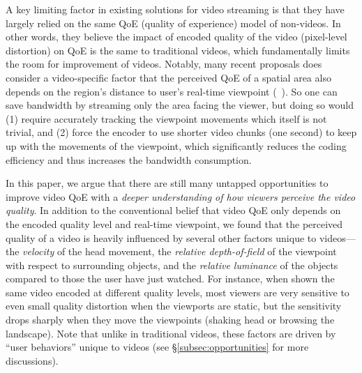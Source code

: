 A key limiting factor in existing solutions for \vr video streaming is that they have largely relied on the same QoE (quality of experience) model of non-\vr videos. 
In other words, they believe the impact of encoded quality of the video (\eg pixel-level distortion) on QoE is the same to traditional videos, which fundamentally limits the room for improvement of \vr videos.
Notably, many recent proposals does consider a {\vr}video-specific factor that the perceived QoE of a spatial area also depends on the region's distance to user's real-time viewpoint (\eg~\cite{??,??,??,??}).
So one can save bandwidth by streaming only the area facing the viewer, but doing so would (1) require accurately tracking the viewpoint movements which itself is not trivial, and (2) force the encoder to use shorter video chunks (\eg one second) to keep up with the movements of the viewpoint, which significantly reduces the coding efficiency and thus increases the bandwidth consumption.

In this paper, we argue that there are still many untapped opportunities to improve \vr video QoE with a {\em deeper understanding of how viewers perceive the \vr video quality}.
In addition to the conventional belief that \vr video QoE only depends on the encoded quality level and real-time viewpoint, 
we found that the perceived quality of a \vr video is heavily influenced by several other factors unique to \vr videos---the {\em velocity} of the head movement, the {\em relative depth-of-field} of the viewpoint with respect to surrounding objects, and the {\em relative luminance} of the objects compared to those the user have just watched. 
For instance, when shown the same video encoded at different quality levels, most viewers are very sensitive to even small quality distortion when the viewports are static, but the sensitivity drops sharply when they move the viewpoints (\eg shaking head or browsing the landscape). 
Note that unlike in traditional videos, these factors are driven by ``user behaviors'' unique to \vr videos (see \S\ref{subsec:opportunities} for more discussions).


